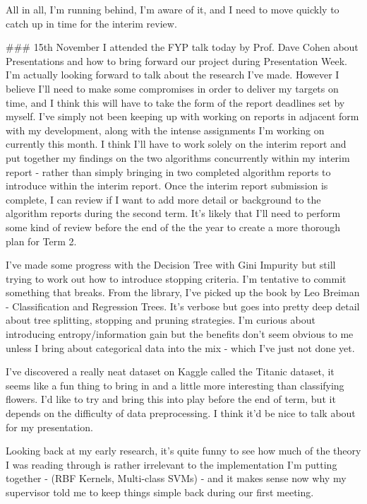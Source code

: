 \documentclass[letterpaper,10pt]{article}
\begin{document}
\begin{markdown}
All in all, I'm running behind, I'm aware of it, and I need to move quickly to catch up in time for the interim review.
  
### 15th November
I attended the FYP talk today by Prof. Dave Cohen about Presentations and how to bring forward our project during Presentation Week. I'm actually looking forward to talk about the research I've made. However I believe I'll need to make some compromises in order to deliver my targets on time, and I think this will have to take the form of the report deadlines set by myself.   
I've simply not been keeping up with working on reports in adjacent form with my development, along with the intense assignments I'm working on currently this month. I think I'll have to work solely on the interim report and put together my findings on the two algorithms concurrently within my interim report - rather than simply bringing in two completed algorithm reports to introduce within the interim report. Once the interim report submission is complete, I can review if I want to add more detail or background to the algorithm reports during the second term.   
It's likely that I'll need to perform some kind of review before the end of the the year to create a more thorough plan for Term 2.   
  
I've made some progress with the Decision Tree with Gini Impurity but still trying to work out how to introduce stopping criteria. I'm tentative to commit something that breaks.  
From the library, I've picked up the book by Leo Breiman - Classification and Regression Trees. It's verbose but goes into pretty deep detail about tree splitting, stopping and pruning strategies. I'm curious about introducing entropy/information gain but the benefits don't seem obvious to me unless I bring about categorical data into the mix - which I've just not done yet.  

I've discovered a really neat dataset on Kaggle called the Titanic dataset, it seems like a fun thing to bring in and a little more interesting than classifying flowers. I'd like to try and bring this into play before the end of term, but it depends on the difficulty of data preprocessing. I think it'd be nice to talk about for my presentation.  

Looking back at my early research, it's quite funny to see how much of the theory I was reading through is rather irrelevant to the implementation I'm putting together - (RBF Kernels, Multi-class SVMs) - and it makes sense now why my supervisor told me to keep things simple back during our first meeting.
  

\end{markdown}
\end{document}
